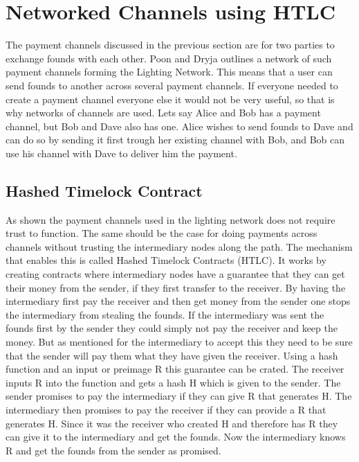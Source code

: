 \documentclass[informationsecurity]{gucmasterproject}
\begin{document}
\chapter{Networked Channels using HTLC}

The payment channels discussed in the previous section are for two parties to exchange founds with each other.
Poon and Dryja \cite{poon2015bitcoin} outlines a network of such payment channels forming
the Lighting Network. This means that a user can send founds to another across several payment channels. If everyone needed to create a payment channel everyone else it would not be very useful, so that is why networks of channels are used. Lets say Alice and Bob has a payment channel, but Bob and Dave also has one. Alice wishes to send founds to Dave and can do so by sending it first trough her existing channel with Bob, and Bob can use his channel with Dave to deliver him the payment.

\section{Hashed Timelock Contract}

As shown the payment channels used in the lighting network does not require trust to function. The same should be the case for doing payments across channels without trusting the intermediary nodes along the path. The mechanism that enables this is called Hashed Timelock Contracts (HTLC).
It works by creating contracts where intermediary nodes have a guarantee that they can get their money from the sender, if they first transfer to the receiver. By having the intermediary first pay the receiver and then get money from the sender one stops the intermediary from stealing the founds. If the intermediary was sent the founds first by the sender they could simply not pay the receiver and keep the money. But as mentioned for the intermediary to accept this they need to be sure that the sender will pay them what they have given the receiver. Using a hash function and an input or preimage R this guarantee can be crated. The receiver inputs R into the function and gets a hash H which is given to the sender. The sender promises to pay the intermediary if they can give R that generates H. The intermediary then promises to pay the receiver if they can provide a R that generates H. Since it was the receiver who created H and therefore has R they can give it to the intermediary and get the founds. Now the intermediary knows R and get the founds from the sender as promised.
\end{document}

